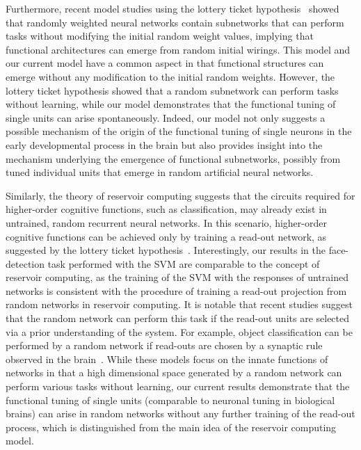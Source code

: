 \documentclass[sn-mathphys]{sn-jnl}%
\theoremstyle{thmstyleone}%
\theoremstyle{thmstyletwo}%
\theoremstyle{thmstylethree}%
\begin{document}
Furthermore, recent model studies using the lottery ticket hypothesis~\cite{frankle2019stabilizing,ramanujan2020s} showed that randomly weighted neural networks contain subnetworks that can perform tasks without modifying the initial random weight values,
implying that functional architectures can emerge from random initial wirings.
This model and our current model have a common aspect in that functional structures can emerge without any modification to the initial random weights.
However, the lottery ticket hypothesis showed that a random subnetwork can perform tasks without learning,
while our model demonstrates that the functional tuning of single units can arise spontaneously.
Indeed, our model not only suggests a possible mechanism of the origin of the functional tuning of single neurons in the early developmental process in the brain but also provides insight into the mechanism underlying the emergence of functional subnetworks, 
possibly from tuned individual units that emerge in random artificial neural networks.


Similarly, the theory of reservoir computing suggests that the circuits required for higher-order cognitive functions, such as classification, may already exist in untrained, random recurrent neural networks.
In this scenario, higher-order cognitive functions can be achieved only by training a read-out network, as suggested by the lottery ticket hypothesis~\cite{verstraeten2007experimental,bellec2020solution}.
Interestingly, our results in the face-detection task performed with the SVM are comparable to the concept of reservoir computing, 
as the training of the SVM with the responses of untrained networks is consistent with the procedure of training a read-out projection from random networks in reservoir computing.
It is notable that recent studies suggest that the random network can perform this task if the read-out units are selected via a prior understanding of the system.
For example, object classification can be performed by a random network if read-outs are chosen by a synaptic rule observed in the brain~\cite{weidel2021unsupervised,tetzlaff2013synaptic}.
While these models focus on the innate functions of networks in that a high dimensional space generated by a random network can perform various tasks without learning,
our current results demonstrate that the functional tuning of single units (comparable to neuronal tuning in biological brains) can arise in random networks without any further training of the read-out process, 
which is distinguished from the main idea of the reservoir computing model.
\end{document}
